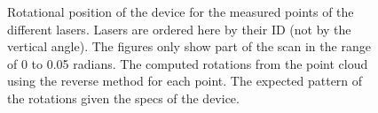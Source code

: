 \documentclass[english]{article}
\begin{document}
\begin{figure}
  \begin{center}
    \caption{Rotational position of the device for the measured points of the
    different lasers.
    Lasers are ordered here by their ID (not by the vertical angle). The figures
    only show part of the scan in the range of 0 to 0.05 radians.
     The computed rotations from the point
    cloud using the reverse method for each point.
     The expected pattern of the rotations
    given the specs of the device.}
		\label{fig:raw_meas}
  \end{center}
\end{figure}




\end{document}
